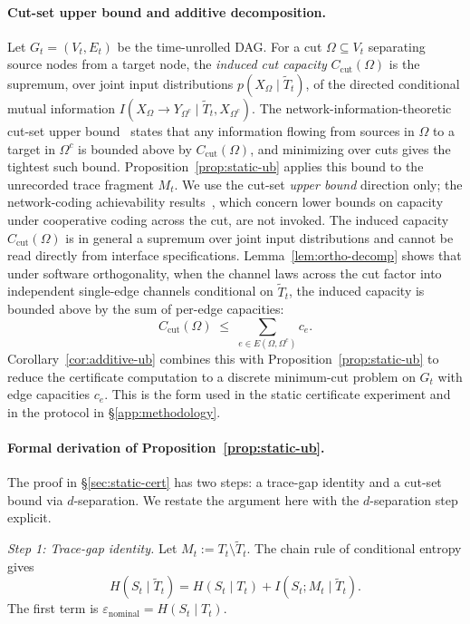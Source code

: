 \documentclass{article}
\begin{document}
\paragraph{Cut-set upper bound and additive decomposition.}
Let $G_t = (V_t, E_t)$ be the time-unrolled DAG. For a cut $\Omega \subseteq V_t$ separating source nodes from a target node, the \emph{induced cut capacity} $C_\text{cut}(\Omega)$ is the supremum, over joint input distributions $p(X_\Omega \mid \tilde T_t)$, of the directed conditional mutual information $I(X_\Omega \to Y_{\Omega^c} \mid \tilde T_t, X_{\Omega^c})$. The network-information-theoretic cut-set upper bound~\citep{elgamal2011network} states that any information flowing from sources in $\Omega$ to a target in $\Omega^c$ is bounded above by $C_\text{cut}(\Omega)$, and minimizing over cuts gives the tightest such bound. Proposition~\ref{prop:static-ub} applies this bound to the unrecorded trace fragment $M_t$. We use the cut-set \emph{upper bound} direction only; the network-coding achievability results~\citep{ahlswede2000network}, which concern lower bounds on capacity under cooperative coding across the cut, are not invoked. The induced capacity $C_\text{cut}(\Omega)$ is in general a supremum over joint input distributions and cannot be read directly from interface specifications. Lemma~\ref{lem:ortho-decomp} shows that under software orthogonality, when the channel laws across the cut factor into independent single-edge channels conditional on $\tilde T_t$, the induced capacity is bounded above by the sum of per-edge capacities:
\[
  C_\text{cut}(\Omega) \;\leq\; \sum_{e \in E(\Omega, \Omega^c)} c_e.
\]
Corollary~\ref{cor:additive-ub} combines this with Proposition~\ref{prop:static-ub} to reduce the certificate computation to a discrete minimum-cut problem on $G_t$ with edge capacities $c_e$. This is the form used in the static certificate experiment and in the protocol in \S\ref{app:methodology}.

\paragraph{Formal derivation of Proposition~\ref{prop:static-ub}.}
The proof in \S\ref{sec:static-cert} has two steps: a trace-gap identity and a cut-set bound via $d$-separation. We restate the argument here with the $d$-separation step explicit.

\emph{Step 1: Trace-gap identity.} Let $M_t := T_t \setminus \tilde T_t$. The chain rule of conditional entropy gives
\[
  H(S_t \mid \tilde T_t) = H(S_t \mid T_t) + I(S_t; M_t \mid \tilde T_t).
\]
The first term is $\varepsilon_\text{nominal} = H(S_t \mid T_t)$.
\end{document}
